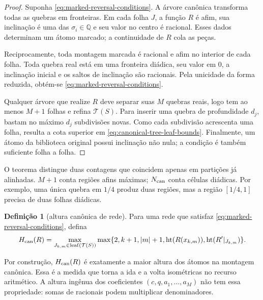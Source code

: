\documentclass[11pt,a4paper]{article}
\theoremstyle{definition}
\newtheorem{definition}[theorem]{Definição}
\theoremstyle{remark}
\newcommand{\height}{\operatorname{ht}}
\begin{document}
\begin{proof}
Suponha \eqref{eq:marked-reversal-conditions}. A árvore canônica transforma
todas as quebras em fronteiras. Em cada folha $J$, a função $R$ é afim, sua
inclinação é uma das $\sigma_i\in\mathbb Q$ e seu valor no centro é racional.
Esses dados determinam um átomo marcado; a continuidade de $R$ cola as peças.

Reciprocamente, toda montagem marcada é racional e afim no interior de cada
folha. Toda quebra real está em uma fronteira diádica, seu valor em $0$, a
inclinação inicial e os saltos de inclinação são racionais. Pela unicidade da
forma reduzida, obtém-se \eqref{eq:marked-reversal-conditions}.

Qualquer árvore que realize $R$ deve separar suas $M$ quebras reais, logo tem
ao menos $M+1$ folhas e refina $\mathcal T(S)$. Para inserir uma quebra de
profundidade $d_j$, bastam no máximo $d_j$ subdivisões novas. Como cada
subdivisão acrescenta uma folha, resulta a cota superior em
\eqref{eq:canonical-tree-leaf-bounds}. Finalmente, um átomo da biblioteca
original possui inclinação não nula; a condição é também suficiente folha a
folha.
\end{proof}

O teorema distingue duas contagens que coincidem apenas em partições já
alinhadas. $M+1$ conta regiões afins máximas; $N_{\rm can}$ conta células
diádicas. Por exemplo, uma única quebra em $1/4$ produz duas regiões, mas a
região $[1/4,1]$ precisa de duas folhas diádicas.

\begin{definition}[altura canônica de rede]
\label{def:canonical-network-height}
Para uma rede que satisfaz \eqref{eq:marked-reversal-conditions}, defina
\begin{equation}
 H_{\rm can}(R)=
 \max_{J_{k,m}\in\operatorname{leaf}(\mathcal T(S))}
 \max\{2,k+1,|m|+1,\height(R(x_{k,m})),\height(R'|_{J_{k,m}})\}.
 \label{eq:canonical-network-height}
\end{equation}
\end{definition}

Por construção, $H_{\rm can}(R)$ é exatamente a maior altura dos átomos na
montagem canônica. Essa é a medida que torna a ida e a volta isométricas no
recurso aritmético. A altura ingênua dos coeficientes
$(c,q,a_1,\ldots,a_M)$ não tem essa propriedade: somas de racionais podem
multiplicar denominadores.
\end{document}
